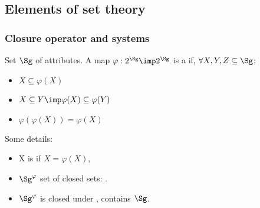 

\subsection{Elements of set theory}

\begin{frame}
\frametitle{Closure operator and systems}

Set $\Sg$ of attributes. A map $\varphi: 2^{\Sg} \imp 2^{\Sg}$ is a 
 if, $\forall X, Y, Z \subseteq \Sg$:
\begin{itemize}
	\item $X \subseteq \varphi(X)$ \quad {}
	\item $X \subseteq Y \imp \varphi(X) \subseteq \varphi(Y)$ 
	\quad {}
	\item $\varphi(\varphi(X)) = \varphi(X)$ \quad {}
\end{itemize}

\vspace{1.2em}

Some details:
\begin{itemize}
	\item X is  if $X = \varphi(X)$,
	\item $\Sg^\varphi$ set of closed sets: .
	\item $\Sg^\varphi$ is closed under , contains $\Sg$.
\end{itemize}

\end{frame}

